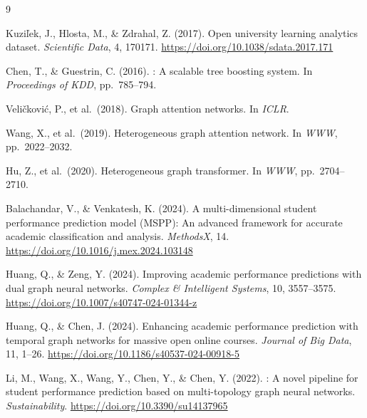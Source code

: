\documentclass[sigconf,review]{acmart}
\begin{document}


\begin{thebibliography}{9}

Kuzi\v{l}ek, J., Hlosta, M., \& Zdrahal, Z. (2017).
\newblock Open university learning analytics dataset.
\newblock \emph{Scientific Data}, 4, 170171.
\newblock \url{https://doi.org/10.1038/sdata.2017.171}

Chen, T., \& Guestrin, C. (2016).
: A scalable tree boosting system.
\newblock In \emph{Proceedings of KDD}, pp.\ 785--794.

Veli\v{c}kovi\'{c}, P., et al.\ (2018).
\newblock Graph attention networks.
\newblock In \emph{ICLR}.

Wang, X., et al.\ (2019).
\newblock Heterogeneous graph attention network.
\newblock In \emph{WWW}, pp.\ 2022--2032.

Hu, Z., et al.\ (2020).
\newblock Heterogeneous graph transformer.
\newblock In \emph{WWW}, pp.\ 2704--2710.

Balachandar, V., \& Venkatesh, K. (2024).
\newblock A multi-dimensional student performance prediction model ({MSPP}):
  An advanced framework for accurate academic classification and analysis.
\newblock \emph{MethodsX}, 14.
\newblock \url{https://doi.org/10.1016/j.mex.2024.103148}

Huang, Q., \& Zeng, Y. (2024).
\newblock Improving academic performance predictions with dual graph neural
  networks.
\newblock \emph{Complex \& Intelligent Systems}, 10, 3557--3575.
\newblock \url{https://doi.org/10.1007/s40747-024-01344-z}

Huang, Q., \& Chen, J. (2024).
\newblock Enhancing academic performance prediction with temporal graph
  networks for massive open online courses.
\newblock \emph{Journal of Big Data}, 11, 1--26.
\newblock \url{https://doi.org/10.1186/s40537-024-00918-5}

Li, M., Wang, X., Wang, Y., Chen, Y., \& Chen, Y. (2022).
: A novel pipeline for student performance prediction
  based on multi-topology graph neural networks.
\newblock \emph{Sustainability}.
\newblock \url{https://doi.org/10.3390/su14137965}


\end{thebibliography}
\end{document}
